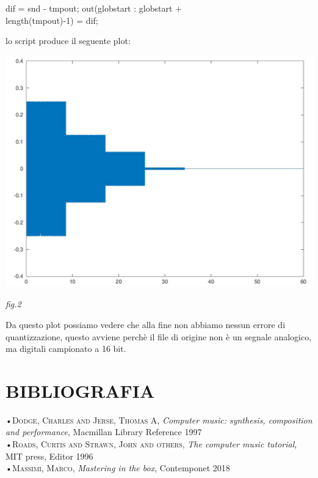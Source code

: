 \documentclass[11pt]{article}
\begin{document}
\begin{multicols*}{2}
\begin{center}
\begin{minipage}[c]{6.3cm}
\begin{sffamily}
dif = snd - tmpout;
out(globstart : globstart + \\
length(tmpout)-1) = dif;\\

\end{sffamily}
\end{minipage}
\end{center}

lo script produce il seguente plot:

\begin{center}
\includegraphics[scale=0.4]{images/plot02.png}

{\scriptsize \emph{fig.2 }}
\end{center}

Da questo plot possiamo vedere che alla fine non abbiamo nessun errore di quantizzazione, questo avviene perchè il file di origine non è un segnale analogico, ma digitali campionato a 16 bit.

\section*{\centering\small{BIBLIOGRAFIA}}
•\textsc{\textsf {Dodge, Charles and Jerse, Thomas A}}, \emph{Computer music: synthesis, composition and performance}, Macmillan Library Reference 1997\\
•\textsc{\textsf {Roads, Curtis and Strawn, John and others}}, \emph{The computer music tutorial}, MIT press, Editor 1996\\
•\textsc{\textsf {Massimi, Marco}}, \emph{Mastering in the box}, Contemponet 2018\\

\end{multicols*}
\end{document}
